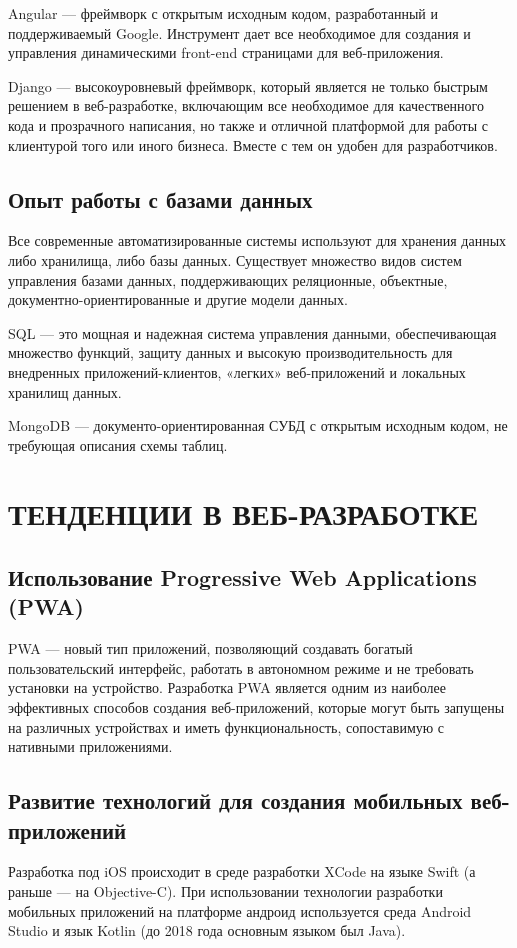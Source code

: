 \documentclass[referat, times]{SCWorks}
\begin{document}
Angular ---  фреймворк с открытым исходным кодом, разработанный и поддерживаемый Google. Инструмент дает все необходимое для создания и управления динамическими front-end страницами для веб-приложения.

Django --- высокоуровневый фреймворк, который является не только быстрым решением в веб-разработке, включающим все необходимое для качественного кода и прозрачного написания, но также и отличной платформой для работы с клиентурой того или иного бизнеса. Вместе с тем он удобен для разработчиков\cite{8}.

\subsection {Опыт работы с базами данных}

Все современные автоматизированные системы используют для хранения данных либо хранилища, либо базы данных. Существует множество видов систем управления базами данных, поддерживающих реляционные, объектные, документно-ориентированные и другие модели данных.

SQL --- это мощная и надежная система управления данными, обеспечивающая множество функций, защиту данных и высокую производительность для внедренных приложений-клиентов, «легких» веб-приложений и локальных хранилищ данных.

MongoDB --- документо-ориентированная СУБД с открытым исходным кодом, не требующая описания схемы таблиц\cite{9}.


\section{\textbf{ТЕНДЕНЦИИ В ВЕБ-РАЗРАБОТКЕ}}
\subsection{Использование Progressive Web Applications (PWA)}
PWA --- новый тип приложений, позволяющий создавать богатый пользовательский интерфейс, работать в автономном режиме и не требовать установки на устройство. Разработка PWA является одним из наиболее эффективных способов создания веб-приложений, которые могут быть запущены на различных устройствах и иметь функциональность, сопоставимую с нативными приложениями\cite{10}.

\subsection{Развитие технологий для создания мобильных веб-приложений}
Разработка под iOS происходит в среде разработки XCode на языке Swift (а раньше --- на Objective-C).
При использовании технологии разработки мобильных приложений на платформе андроид используется среда Android Studio и язык Kotlin (до 2018 года основным языком был Java)\cite{11}.
\end{document}
